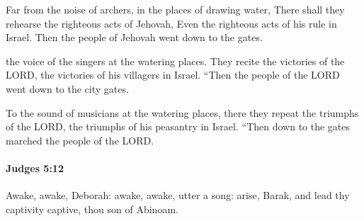 			\begin{versebox}
					\item[BHS] 
					\item[ASV] Far from the noise of archers, in the places of drawing water, There shall they rehearse the righteous acts of Jehovah, Even the righteous acts of his rule in Israel. Then the people of Jehovah went down to the gates.
					\item[NIV] the voice of the singers at the watering places. They recite the victories of the LORD, the victories of his villagers in Israel. “Then the people of the LORD went down to the city gates.
					\item[NRSV] To the sound of musicians at the watering places, there they repeat the triumphs of the LORD, the triumphs of his peasantry in Israel. “Then down to the gates marched the people of the LORD.
			\end{versebox}

		\paragraph{Judges 5:12} %
			\label{JUDGES-5-12}

			Awake, awake, Deborah: awake, awake, utter a song: arise, Barak, and lead thy captivity captive, thou son of Abinoam.

